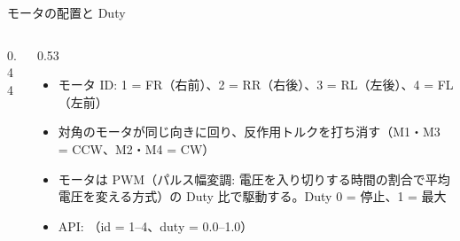
\begin{frame}{モータの配置と Duty}
  \begin{columns}[c]
    \begin{column}{0.44\textwidth}
      \centering
    \end{column}
    \begin{column}{0.53\textwidth}
      \footnotesize
      \begin{itemize}\setlength{\itemsep}{3pt}
        \item モータ ID: 1 = FR（右前）、2 = RR（右後）、3 = RL（左後）、4 = FL（左前）
        \item 対角のモータが同じ向きに回り、反作用トルクを打ち消す（M1・M3 = CCW、M2・M4 = CW）
        \item モータは PWM（パルス幅変調: 電圧を入り切りする時間の割合で平均電圧を変える方式）の Duty 比で駆動する。Duty 0 = 停止、1 = 最大
        \item API: （id = 1--4、duty = 0.0--1.0）
      \end{itemize}
    \end{column}
  \end{columns}
\end{frame}

